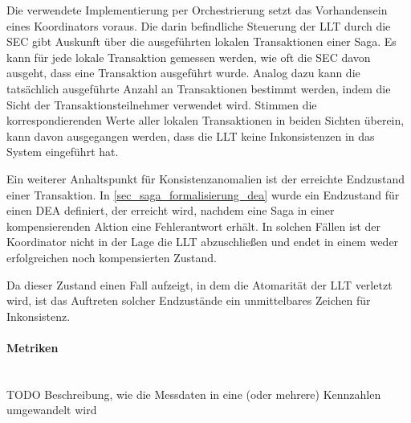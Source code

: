 Die verwendete Implementierung per Orchestrierung setzt das Vorhandensein eines Koordinators voraus. Die darin befindliche Steuerung der LLT durch die SEC gibt Auskunft über die ausgeführten lokalen Transaktionen einer Saga. Es kann für jede lokale Transaktion gemessen werden, wie oft die SEC davon ausgeht, dass eine Transaktion ausgeführt wurde. Analog dazu kann die tatsächlich ausgeführte Anzahl an Transaktionen bestimmt werden, indem die Sicht der Transaktionsteilnehmer verwendet wird. Stimmen die korrespondierenden Werte aller lokalen Transaktionen in beiden Sichten überein, kann davon ausgegangen werden, dass die LLT keine Inkonsistenzen in das System eingeführt hat.

Ein weiterer Anhaltspunkt für Konsistenzanomalien ist der erreichte Endzustand einer Transaktion. In \ref{sec_saga_formalisierung_dea} wurde ein Endzustand für einen DEA definiert, der erreicht wird, nachdem eine Saga in einer kompensierenden Aktion eine Fehlerantwort erhält. In solchen Fällen ist der Koordinator nicht in der Lage die LLT abzuschließen und endet in einem weder erfolgreichen noch kompensierten Zustand. 

Da dieser Zustand einen Fall aufzeigt, in dem die Atomarität der LLT verletzt wird, ist das Auftreten solcher Endzustände ein unmittelbares Zeichen für Inkonsistenz.

\paragraph*{Metriken} \mbox{}\\
TODO Beschreibung, wie die Messdaten in eine (oder mehrere) Kennzahlen umgewandelt wird